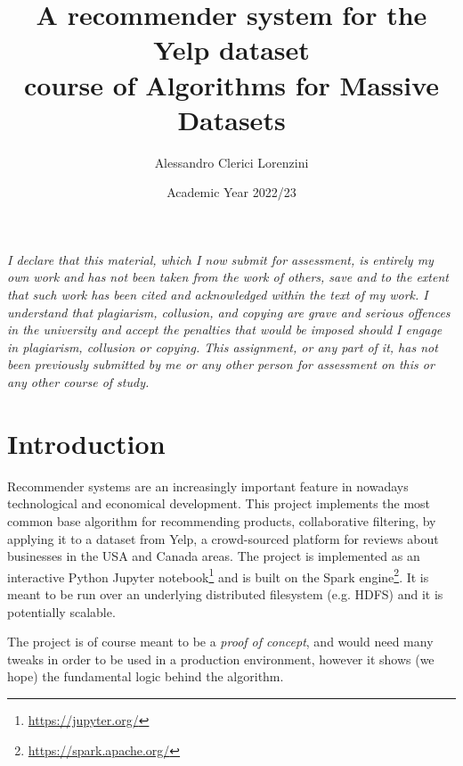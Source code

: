 \documentclass[11pt,a4paper]{article}
\title{A recommender system for the Yelp dataset\\
{\small course of Algorithms for Massive Datasets}}
\author{Alessandro Clerici Lorenzini}
\date{Academic Year 2022/23}
\begin{document}
\maketitle

\begin{multicols}{2}


\textit{I declare that this material, which I now submit for assessment, is entirely my own work and has not been taken from the work of others, save and to the extent that such work has been cited and acknowledged within the text of my work. I understand that plagiarism, collusion, and copying are grave and serious offences in the university and accept the penalties that would be imposed should I engage in plagiarism, collusion or copying. This assignment, or any part of it, has not been previously submitted by me or any other person for assessment on this or any other course of study.}



\section{Introduction}
Recommender systems are an increasingly important feature in nowadays technological and economical development.
This project implements the most common base algorithm for recommending products, collaborative filtering, by applying it to a dataset from Yelp, a crowd-sourced platform for reviews about businesses in the USA and Canada areas.
The project is implemented as an interactive Python Jupyter notebook\footnote{\url{https://jupyter.org/}} and is built on the Spark engine\footnote{\url{https://spark.apache.org/}}.
It is meant to be run over an underlying distributed filesystem (e.g. HDFS) and it is potentially scalable.

The project is of course meant to be a \emph{proof of concept}, and would need many tweaks in order to be used in a production environment, however it shows (we hope) the fundamental logic behind the algorithm.


\end{multicols}
\end{document}
